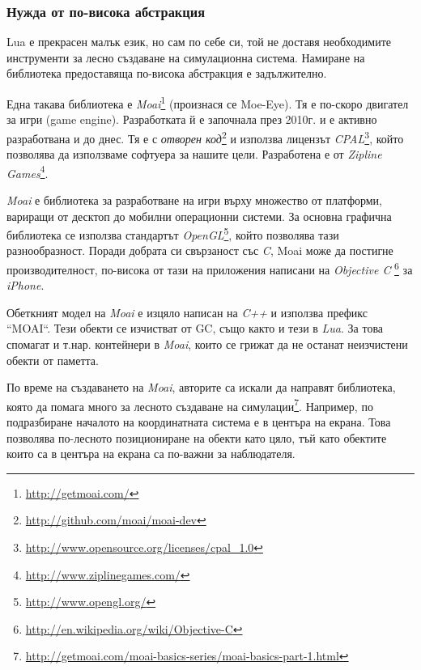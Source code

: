 				
				
								
		
		\subsubsection{Нужда от по-висока абстракция}
		
			Lua е прекрасен малък език, но сам по себе си, той не доставя необходимите инструменти
			за лесно създаване на симулационна система. Намиране на библиотека предоставяща по-висока
			абстракция е задължително.
			
			Една такава библиотека е \emph{Moai}\footnote{\url{http://getmoai.com/}} (произнася се Moe-Eye).
			Тя е по-скоро двигател за игри (game engine).
			Разработката й е започнала през 2010г. и е активно разработвана и до днес. 
			Тя е с \emph{отворен код}\footnote{\url{http://github.com/moai/moai-dev}}
			и използва лицензът \emph{CPAL}\footnote{\url{http://www.opensource.org/licenses/cpal_1.0}}, който
			позволява да използваме софтуера за нашите цели. 
			Разработена е от \emph{Zipline Games}\footnote{\url{http://www.ziplinegames.com/}}.						
			
			\emph{Moai} е библиотека за разработване на игри върху множество от платформи, вариращи от десктоп до
			мобилни операционни системи. За основна графична библиотека се използва стандартът 
			\emph{OpenGL}\footnote{\url{http://www.opengl.org/}}, който позволява тази разнообразност.
			Поради добрата си свързаност със \emph{C}, Moai може да постигне производителност, по-висока
			от тази на приложения написани на  \emph{Objective C}
			\footnote{\url{http://en.wikipedia.org/wiki/Objective-C}} за \emph{iPhone}.

			Обеткният модел на \emph{Moai} е изцяло написан на \emph{C++} и използва префикс ``MOAI``. Тези обекти
			се изчистват от \ac{GC}, също както и тези в \emph{Lua}. За това спомагат и т.нар. контейнери в \emph{Moai},
			които се грижат да не останат неизчистени обекти от паметта.
			
			По време на създаването на \emph{Moai}, авторите са искали да направят библиотека, която да помага много
			за лесното създаване на симулации\footnote{\url{http://getmoai.com/moai-basics-series/moai-basics-part-1.html}}.
			Например, по подразбиране началото на координатната система е в центъра на екрана. Това позволява по-лесното
			позициониране на обекти като цяло, тъй като обектите които са в центъра на екрана са по-важни за наблюдателя.
			
